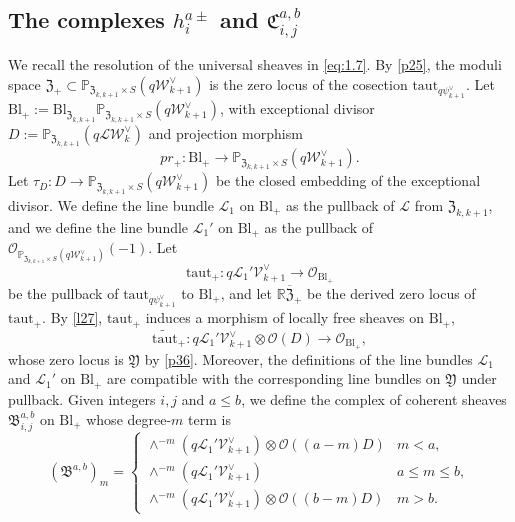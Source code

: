 \documentclass{amsart}
\numberwithin{equation}{section}
\newcommand\mc{\mathcal}
\newcommand\mf{\mathfrak}
\newcommand\mb{\mathbb}
\newcommand{\Bl}{\mathrm{Bl}}
\newcommand{\taut}{\mathrm{taut}}
\theoremstyle{definition}
\theoremstyle{remark}
\begin{document}
\subsection{The complexes $h_{i}^{a\pm}$ and $\mf{C}_{i,j}^{a,b}$}
We recall the resolution of the universal sheaves in \cref{eq:1.7}. By \cref{p25}, the moduli space $\mf{Z}_+\subset \mb{P}_{\mf{Z}_{k,k+1}\times S}(q\mc{W}_{k+1}^{\vee})$ 
is the zero locus of the cosection $\taut_{q\psi_{k+1}^{\vee}}$. Let $\Bl_+:=\Bl_{\mf{Z}_{k,k+1}}\mb{P}_{\mf{Z}_{k,k+1}\times S}(q\mc{W}_{k+1}^{\vee})$, with exceptional divisor $D:=\mb{P}_{\mf{Z}_{k,k+1}}(q\mc{L}\mc{W}_{k}^{\vee})$ and projection morphism
$$pr_{+}:\Bl_{+}\to \mb{P}_{\mf{Z}_{k,k+1}\times S}(q\mc{W}_{k+1}^{\vee}).$$
Let $\tau_D:D\to \mb{P}_{\mf{Z}_{k,k+1}\times S}(q\mc{W}_{k+1}^{\vee})$ be the closed embedding of the exceptional divisor. We define the line bundle $\mc{L}_1$ on $\Bl_+$ as the pullback of $\mc{L}$ from $\mf{Z}_{k,k+1}$, and we define the line bundle $\mc{L}_1'$ on $\Bl_+$ as the pullback of $\mc{O}_{\mb{P}_{\mf{Z}_{k,k+1}\times S}(q\mc{W}_{k+1}^{\vee})}(-1)$. Let
\begin{equation}
  \label{eq31}
  \taut_+:q\mc{L}_{1}'\mc{V}_{k+1}^{\vee}\to \mc{O}_{\Bl_{+}}  
\end{equation}
be the pullback of $\taut_{q\psi_{k+1}^{\vee}}$ to $\Bl_+$, and let $\mb{R}\overline{\mf{Z}}_{+}$ be the derived zero locus of $\taut_+$. By \cref{l27}, $\taut_+$ induces a morphism of locally free sheaves on $\Bl_+$,
\begin{equation}
  \label{eq32}
  \widetilde{\taut}_+:q\mc{L}_{1}'\mc{V}_{k+1}^{\vee}\otimes \mc{O}(D)\to \mc{O}_{\Bl_{+}},
\end{equation}
whose zero locus is $\mf{Y}$ by \cref{p36}. Moreover, the definitions of the line bundles $\mc{L}_1$ and $\mc{L}_1'$ on $\Bl_+$ are compatible with the corresponding line bundles on $\mf{Y}$ under pullback. Given integers $i,j$ and $a\leq b$, we define the complex of coherent sheaves $\mf{B}_{i,j}^{a,b}$ on $\Bl_{+}$ whose degree-$m$ term is
  \begin{equation}
    \label{d64}
     (\mf{B}^{a,b})_{m}=
    \begin{cases}
      \wedge^{-m}(q\mc{L}_{1}' \mc{V}_{k+1}^{\vee})\otimes \mc{O}((a-m)D) & m<a, \\
      \wedge^{-m}(q\mc{L}_{1}' \mc{V}_{k+1}^{\vee}) & a\leq m\leq b, \\
     \wedge^{-m}(q\mc{L}_{1}' \mc{V}_{k+1}^{\vee})\otimes \mc{O}((b-m)D) & m>b.
    \end{cases}
  \end{equation}
\end{document}

